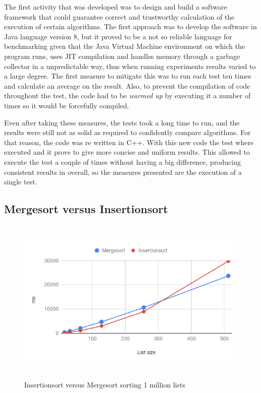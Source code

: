 \documentclass[a4paper,12pt]{article}
\begin{document}
The first activity that was developed was to design and build a software framework that could guarantee correct and trustworthy calculation of the execution of certain algorithms. The first approach was to develop the software in Java language version 8, but it proved to be a not so reliable language for benchmarking given that the Java Virtual Machine environment on which the program runs, uses JIT  compilation and handles memory through a garbage collector in a unpredictable way, thus when running experiments results varied to a large degree. The first measure to mitigate this was to run each test ten times and calculate an average on the result. Also, to prevent the compilation of code throughout the test, the code had to be {\it warmed up} by executing it a number of times so it would be forcefully compiled. 

Even after taking these measures, the tests took a long time to run, and the results were still not as solid as required to confidently compare algorithms. For that reason, the code was re written in C++. With this new code the test where  executed and it prove to give more concise and uniform results. This allowed to execute the test a couple of times without having a big difference, producing consistent results in overall, so the measures presented are the execution of a single test.

\subsection{Mergesort versus Insertionsort}

\begin{figure}[H]
    \centering
     \includegraphics[height=8cm,keepaspectratio]{./images/InsertionvsMerge.png}
    \caption{Insertionsort versus Mergesort sorting 1 million lists}
    \label{fig:InsrtVsMerge}
\end{figure}
\end{document}
